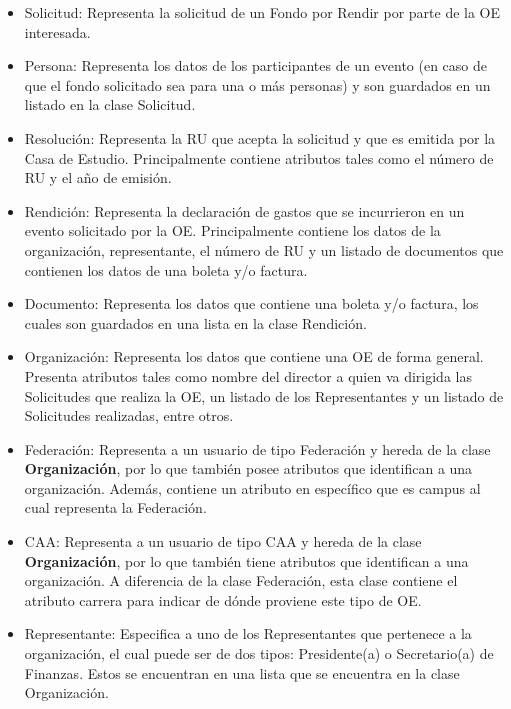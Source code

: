 \begin{itemize}
    \item Solicitud: Representa la solicitud de un Fondo por Rendir por parte de la OE interesada.
    \item Persona: Representa los datos de los participantes de un evento (en caso de que el fondo solicitado sea para una o más personas) y son guardados en un listado en la clase Solicitud.
    \item Resolución: Representa la RU que acepta la solicitud y que es emitida por la Casa de Estudio. Principalmente contiene atributos tales como el número de RU y el año de emisión.
    \item Rendición: Representa la declaración de gastos que se incurrieron en un evento solicitado por la OE. Principalmente contiene los datos de la organización, representante, el número de RU y un listado de documentos que contienen los datos de una boleta y/o factura. 
    \item Documento: Representa los datos que contiene una boleta y/o factura, los cuales son guardados en una lista en la clase Rendición.
    \item Organización: Representa los datos que contiene una OE de forma general. Presenta atributos tales como nombre del director a quien va dirigida las Solicitudes que realiza la OE, un listado de los Representantes y un listado de Solicitudes realizadas, entre otros.
    \item Federación: Representa a un usuario de tipo Federación y hereda de la clase \textbf{Organización}, por lo que también posee atributos que identifican a una organización. Además, contiene un atributo en específico que es campus al cual representa la Federación.
    \item CAA: Representa a un usuario de tipo CAA y hereda de la clase \textbf{Organización}, por lo que también tiene atributos que identifican a una organización. A diferencia de la clase Federación, esta clase contiene el atributo carrera para indicar de dónde proviene este tipo de OE.
    \item Representante: Especifica a uno de los Representantes que pertenece a la organización, el cual puede ser de dos tipos: Presidente(a) o Secretario(a) de Finanzas. Estos se encuentran en una lista que se encuentra en la clase Organización.
\end{itemize}


